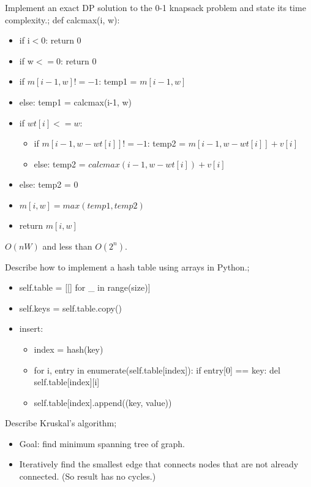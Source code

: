 \documentclass{article}
\begin{document}
Implement an exact DP solution  to the 0-1 knapsack problem and state its time complexity.; def calcmax(i, w): \begin{itemize} \item if i$<$0: return 0 \item if w$<=$0: return 0 \item if $m[i-1,w] != -1$: temp1 = $m[i-1,w]$ \item else: temp1 = calcmax(i-1, w) \item if $wt[i] <= w$: \begin{itemize} \item if $m[i-1,w-wt[i]] != -1$: temp2 = $m[i-1, w-wt[i]] + v[i]$ \item else: temp2 = $calcmax(i-1, w-wt[i]) + v[i]$ \end{itemize} \item else: temp2 = 0 \item $m[i,w]=max(temp1, temp2)$ \item return $m[i,w]$ \end{itemize} $O(nW)$ and less than $O(2^n)$.

Describe how to implement a hash table using arrays in Python.; \begin{itemize} \item self.table = [[] for \_ in range(size)] \item self.keys = self.table.copy() \item insert: \begin{itemize} \item index = hash(key) \item for i, entry in enumerate(self.table[index]): if entry[0] == key: del self.table[index][i] \item self.table[index].append((key, value)) \end{itemize} \end{itemize}

Describe Kruskal's algorithm; \begin{itemize} \item Goal: find minimum spanning tree of graph. \item Iteratively find the smallest edge that connects nodes that are not already connected. (So result has no cycles.) \end{itemize}
\end{document}
